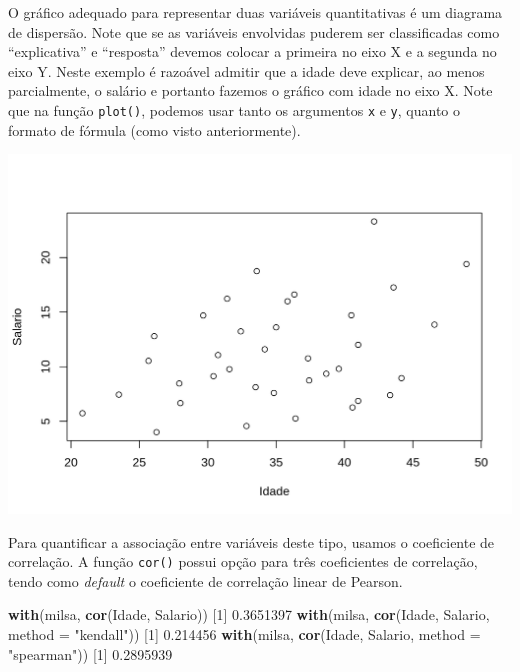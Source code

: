 \documentclass[10pt,a4paper]{book}
\newenvironment{Shaded}{\begin{snugshade}}{\end{snugshade}}
\newcommand{\KeywordTok}[1]{\textcolor[rgb]{0.13,0.29,0.53}{\textbf{#1}}}
\newcommand{\DataTypeTok}[1]{\textcolor[rgb]{0.13,0.29,0.53}{#1}}
\newcommand{\DecValTok}[1]{\textcolor[rgb]{0.00,0.00,0.81}{#1}}
\newcommand{\FloatTok}[1]{\textcolor[rgb]{0.00,0.00,0.81}{#1}}
\newcommand{\StringTok}[1]{\textcolor[rgb]{0.31,0.60,0.02}{#1}}
\newcommand{\OperatorTok}[1]{\textcolor[rgb]{0.81,0.36,0.00}{\textbf{#1}}}
\newcommand{\NormalTok}[1]{#1}
\begin{document}
O gráfico adequado para representar duas variáveis quantitativas é um
diagrama de dispersão. Note que se as variáveis envolvidas puderem ser
classificadas como ``explicativa'' e ``resposta'' devemos colocar a
primeira no eixo X e a segunda no eixo Y. Neste exemplo é razoável
admitir que a idade deve explicar, ao menos parcialmente, o salário e
portanto fazemos o gráfico com idade no eixo X. Note que na função
\texttt{plot()}, podemos usar tanto os argumentos \texttt{x} e
\texttt{y}, quanto o formato de fórmula (como visto anteriormente).

\begin{Shaded}
\end{Shaded}

\begin{center}\includegraphics{figures/unnamed-chunk-322-1} \end{center}

Para quantificar a associação entre variáveis deste tipo, usamos o
coeficiente de correlação. A função \texttt{cor()} possui opção para
três coeficientes de correlação, tendo como \emph{default} o coeficiente
de correlação linear de Pearson.

\begin{Shaded}
\begin{Highlighting}[]
\KeywordTok{with}\NormalTok{(milsa, }\KeywordTok{cor}\NormalTok{(Idade, Salario))}
\NormalTok{[}\DecValTok{1}\NormalTok{] }\FloatTok{0.3651397}
\KeywordTok{with}\NormalTok{(milsa, }\KeywordTok{cor}\NormalTok{(Idade, Salario, }\DataTypeTok{method =} \StringTok{"kendall"}\NormalTok{))}
\NormalTok{[}\DecValTok{1}\NormalTok{] }\FloatTok{0.214456}
\KeywordTok{with}\NormalTok{(milsa, }\KeywordTok{cor}\NormalTok{(Idade, Salario, }\DataTypeTok{method =} \StringTok{"spearman"}\NormalTok{))}
\NormalTok{[}\DecValTok{1}\NormalTok{] }\FloatTok{0.2895939}
\end{Highlighting}
\end{Shaded}
\end{document}
